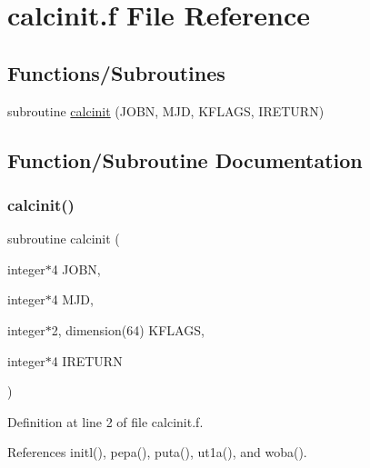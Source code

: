 \hypertarget{calcinit_8f}{}\section{calcinit.\+f File Reference}
\label{calcinit_8f}
\subsection*{Functions/\+Subroutines}
\begin{DoxyCompactItemize}
\item 
subroutine \hyperlink{calcinit_8f_ad3d8a6d4550dec6ad2927c93b459bbd4}{calcinit} (J\+O\+BN, M\+JD, K\+F\+L\+A\+GS, I\+R\+E\+T\+U\+RN)
\end{DoxyCompactItemize}


\subsection{Function/\+Subroutine Documentation}
\mbox{\label{calcinit_8f_ad3d8a6d4550dec6ad2927c93b459bbd4}} 
\subsubsection{\texorpdfstring{calcinit()}{calcinit()}}
{\footnotesize\ttfamily subroutine calcinit (\begin{DoxyParamCaption}\item[{integer$\ast$4}]{J\+O\+BN,  }\item[{integer$\ast$4}]{M\+JD,  }\item[{integer$\ast$2, dimension(64)}]{K\+F\+L\+A\+GS,  }\item[{integer$\ast$4}]{I\+R\+E\+T\+U\+RN }\end{DoxyParamCaption})}



Definition at line 2 of file calcinit.\+f.



References initl(), pepa(), puta(), ut1a(), and woba().

